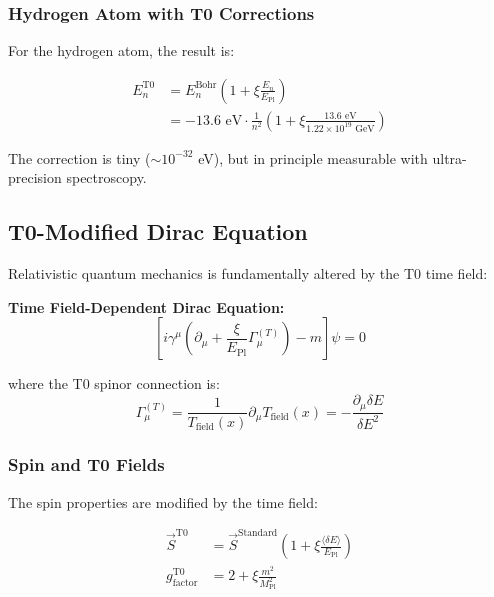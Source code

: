 \documentclass[12pt,a4paper]{article}
\newcommand{\xipar}{\xi}
\newcommand{\Tfield}{T_{\text{field}}}
\newcommand{\deltaE}{\delta E}
\newcommand{\EPlanck}{E_{\text{Pl}}}
\begin{document}
	\subsubsection{Hydrogen Atom with T0 Corrections}
	
	For the hydrogen atom, the result is:
	
	\begin{align}
		E_n^{\text{T0}} &= E_n^{\text{Bohr}} \left(1 + \xipar \frac{E_n}{\EPlanck}\right) \\
		&= -13.6 \text{ eV} \cdot \frac{1}{n^2} \left(1 + \xipar \frac{13.6 \text{ eV}}{1.22 \times 10^{19} \text{ GeV}}\right)
	\end{align}
	
	The correction is tiny ($\sim 10^{-32}$ eV), but in principle measurable with ultra-precision spectroscopy.
	
	\subsection{T0-Modified Dirac Equation}
	
	Relativistic quantum mechanics is fundamentally altered by the T0 time field:
	
	\begin{tcolorbox}[colback=magenta!5!white,colframe=magenta!75!black,title={T0 Dirac Equation}]
		\textbf{Time Field-Dependent Dirac Equation:}
		\begin{equation}
			\left[i\gamma^\mu \left(\partial_\mu + \frac{\xipar}{\EPlanck} \Gamma_\mu^{(T)}\right) - m\right]\psi = 0
		\end{equation}
		
		where the T0 spinor connection is:
		\begin{equation}
			\Gamma_\mu^{(T)} = \frac{1}{\Tfield(x)} \partial_\mu \Tfield(x) = -\frac{\partial_\mu \deltaE}{\deltaE^2}
		\end{equation}
	\end{tcolorbox}
	
	\subsubsection{Spin and T0 Fields}
	
	The spin properties are modified by the time field:
	
	\begin{align}
		\vec{S}^{\text{T0}} &= \vec{S}^{\text{Standard}} \left(1 + \xipar \frac{\langle\deltaE\rangle}{\EPlanck}\right) \\
		g_{\text{factor}}^{\text{T0}} &= 2 + \xipar \frac{m^2}{M_{\text{Pl}}^2}
	\end{align}
	
\end{document}
